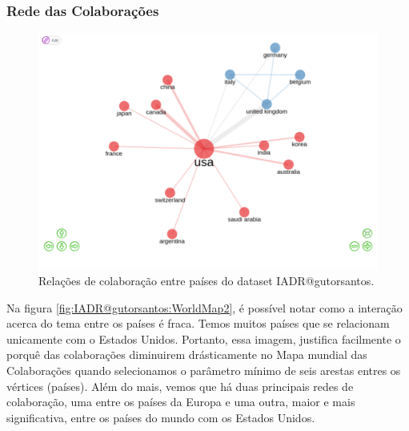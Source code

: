 \subsubsection{Rede das Colaborações}

\begin{figure}
    \centering
\includegraphics[angle=0,width=1\textwidth]{experiments/gutorsantos/AnaliseBibliometrica/IAeDiscriminacao/imgs/CollaborationCountries.png}
    \caption{Relações de colaboração entre países do dataset IADR@gutorsantos.}
    \label{fig:IADR@gutorsantos:CollabCountries}
\end{figure}

Na figura \ref{fig:IADR@gutorsantos:WorldMap2}, é possível notar como a interação acerca do tema entre os países é fraca. Temos muitos países que se relacionam unicamente com o Estados Unidos. Portanto, essa imagem, justifica facilmente o porquê das colaborações diminuirem drásticamente no Mapa mundial das Colaborações quando selecionamos o parâmetro mínimo de seis arestas entres os vértices (países). Além do mais, vemos que há duas principais redes de colaboração, uma entre os países da Europa e uma outra, maior e mais significativa, entre os países do mundo com os Estados Unidos. 


